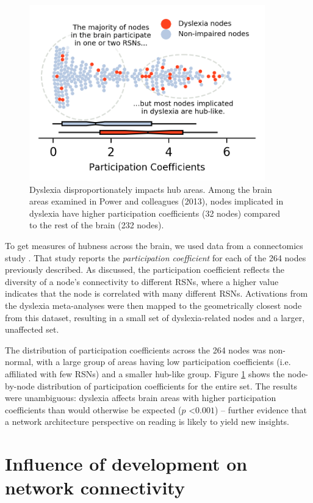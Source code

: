 \begin{figure}[t]
\centering
\includegraphics[height=3in]{images/ch1-dyslexia-hubs.png}
    \caption[Dyslexia disproportionately impacts hub areas.]{Dyslexia disproportionately impacts hub areas. Among the brain areas examined in Power and colleagues (2013), nodes implicated in dyslexia have higher participation coefficients (32 nodes) compared to the rest of the brain (232 nodes).}
\label{fig:ch1-dyslexia-hubs}
\end{figure}

To get measures of hubness across the brain, we used data from a connectomics study \citep{Power2013}. That study reports the \textit{participation coefficient} for each of the 264 nodes previously described. As discussed, the participation coefficient reflects the diversity of a node's connectivity to different RSNs, where a higher value indicates that the node is correlated with many different RSNs. Activations from the dyslexia meta-analyses were then mapped to the geometrically closest node from this dataset, resulting in a small set of dyslexia-related nodes and a larger, unaffected set.

The distribution of participation coefficients across the 264 nodes was non-normal, with a large group of areas having low participation coefficients (i.e. affiliated with few RSNs) and a smaller hub-like group. Figure \ref{fig:ch1-dyslexia-hubs} shows the node-by-node distribution of participation coefficients for the entire set. The results were unambiguous: dyslexia affects brain areas with higher participation coefficients than would otherwise be expected ($p$ \textless $0.001$) -- further evidence that a network architecture perspective on reading is likely to yield new insights. 


\section{Influence of development on network connectivity}

